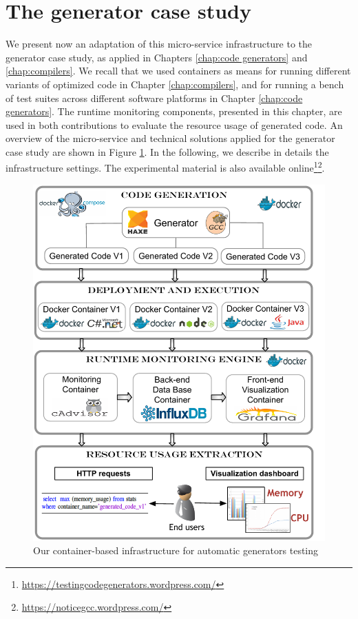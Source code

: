 \section{The generator case study}
\label{mon:case study}
We present now an adaptation of this micro-service infrastructure to the generator case study, as applied in Chapters \ref{chap:code generators} and \ref{chap:compilers}. We recall that we used containers as means for running different variants of optimized code in Chapter \ref{chap:compilers}, and for running a bench of test suites across different software platforms in Chapter \ref{chap:code generators}. 
The runtime monitoring components, presented in this chapter, are used in both contributions to evaluate the resource usage of generated code. 
An overview of the micro-service and technical solutions applied for the generator case study are shown in Figure \ref{mon:infra}. In the following, we describe in details the infrastructure settings. The experimental material is also available online\footnote{\url{https://testingcodegenerators.wordpress.com/}}\footnote{\url{https://noticegcc.wordpress.com/}}.

\begin{figure}[h]
	\centering
	\includegraphics[width=0.73\linewidth]{chapitre5/fig/infra_summary}
	\caption{Our container-based infrastructure for automatic generators testing}
	\label{mon:infra}
\end{figure}


